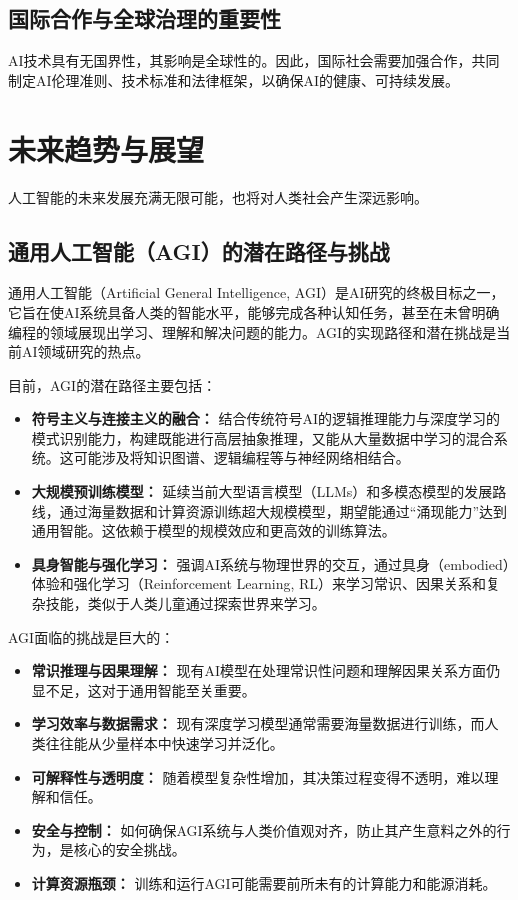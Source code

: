 \subsection{国际合作与全球治理的重要性}
AI技术具有无国界性，其影响是全球性的。因此，国际社会需要加强合作，共同制定AI伦理准则、技术标准和法律框架，以确保AI的健康、可持续发展。

\section{未来趋势与展望}

人工智能的未来发展充满无限可能，也将对人类社会产生深远影响。

\subsection{通用人工智能（AGI）的潜在路径与挑战}
通用人工智能（Artificial General Intelligence, AGI）是AI研究的终极目标之一，它旨在使AI系统具备人类的智能水平，能够完成各种认知任务，甚至在未曾明确编程的领域展现出学习、理解和解决问题的能力。AGI的实现路径和潜在挑战是当前AI领域研究的热点。

目前，AGI的潜在路径主要包括：
\begin{itemize}
    \item \textbf{符号主义与连接主义的融合：} 结合传统符号AI的逻辑推理能力与深度学习的模式识别能力，构建既能进行高层抽象推理，又能从大量数据中学习的混合系统。这可能涉及将知识图谱、逻辑编程等与神经网络相结合。
    \item \textbf{大规模预训练模型：} 延续当前大型语言模型（LLMs）和多模态模型的发展路线，通过海量数据和计算资源训练超大规模模型，期望能通过“涌现能力”达到通用智能。这依赖于模型的规模效应和更高效的训练算法。
    \item \textbf{具身智能与强化学习：} 强调AI系统与物理世界的交互，通过具身（embodied）体验和强化学习（Reinforcement Learning, RL）来学习常识、因果关系和复杂技能，类似于人类儿童通过探索世界来学习。
\end{itemize}

AGI面临的挑战是巨大的：
\begin{itemize}
    \item \textbf{常识推理与因果理解：} 现有AI模型在处理常识性问题和理解因果关系方面仍显不足，这对于通用智能至关重要。
    \item \textbf{学习效率与数据需求：} 现有深度学习模型通常需要海量数据进行训练，而人类往往能从少量样本中快速学习并泛化。
    \item \textbf{可解释性与透明度：} 随着模型复杂性增加，其决策过程变得不透明，难以理解和信任。
    \item \textbf{安全与控制：} 如何确保AGI系统与人类价值观对齐，防止其产生意料之外的行为，是核心的安全挑战。
    \item \textbf{计算资源瓶颈：} 训练和运行AGI可能需要前所未有的计算能力和能源消耗。
\end{itemize}

